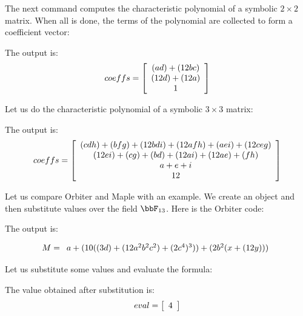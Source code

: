 \bigskip

The next command computes the characteristic polynomial 
of a symbolic $2 \times 2$ matrix. 
When all is done, the terms of the polynomial 
are collected to form a coefficient vector:



The output is:
$$
coeffs = 
\left[
\begin{array}{*{1}c}
(a d) + (12 b c)\\
(12 d) + (12 a)\\
1\\
\end{array}
\right]
$$



\bigskip

Let us do the characteristic polynomial of a symbolic $3 \times 3$ matrix:





The output is:
$$
coeffs = 
\left[
\begin{array}{*{1}c}
(c d h) + (b f g) + (12 b d i) + (12 a f h) + (a e i) + (12 c e g)\\
(12 e i) + (c g) + (b d) + (12 a i) + (12 a e) + (f h)\\
a + e + i\\
12\\
\end{array}
\right]
$$


\bigskip

Let us compare Orbiter and Maple with an example. 
We create an object and then substitute values
over the field $\bbF_{13}$. 
Here is the Orbiter code:



The output is:

$$
M = 
\begin{array}{*{1}c}
a + (10 ((3 d) + (12 a^{2} b^{2} c^{2}) + (2 c^{4})^{3})) + (2 b^{2} (x + (12 y)))\\
\end{array}
$$


\bigskip



Let us substitute some values and evaluate the formula:



The value obtained after substitution is:
$$
eval = 
\left[
\begin{array}{*{1}c}
4\\
\end{array}
\right]
$$


